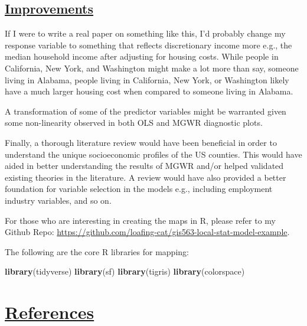\documentclass[
]{article}
\newenvironment{Shaded}{\begin{snugshade}}{\end{snugshade}}
\newcommand{\FunctionTok}[1]{\textcolor[rgb]{0.13,0.29,0.53}{\textbf{#1}}}
\newcommand{\NormalTok}[1]{#1}
\begin{document}
\subsection{\texorpdfstring{\ul{Improvements}}{Improvements}}\label{improvements}

If I were to write a real paper on something like this, I'd probably
change my response variable to something that reflects discretionary
income more e.g., the median household income after adjusting for
housing costs. While people in California, New York, and Washington
might make a lot more than say, someone living in Alabama, people living
in California, New York, or Washington likely have a much larger housing
cost when compared to someone living in Alabama.

A transformation of some of the predictor variables might be warranted
given some non-linearity observed in both OLS and MGWR diagnostic plots.

Finally, a thorough literature review would have been beneficial in
order to understand the unique socioeconomic profiles of the US
counties. This would have aided in better understanding the results of
MGWR and/or helped validated existing theories in the literature. A
review would have also provided a better foundation for variable
selection in the models e.g., including employment industry variables,
and so on.

For those who are interesting in creating the maps in R, please refer to
my Github Repo:
\url{https://github.com/loafing-cat/gis563-local-stat-model-example}.

The following are the core R libraries for mapping:

\begin{Shaded}
\begin{Highlighting}[]
\FunctionTok{library}\NormalTok{(tidyverse)}
\FunctionTok{library}\NormalTok{(sf)}
\FunctionTok{library}\NormalTok{(tigris)}
\FunctionTok{library}\NormalTok{(colorspace)}
\end{Highlighting}
\end{Shaded}

\newpage

\section{\texorpdfstring{\ul{References}}{References}}\label{references}
\end{document}
